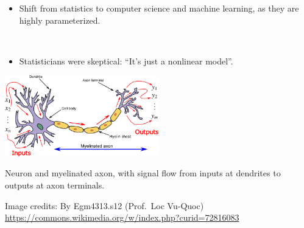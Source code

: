 \documentclass[
  10pt,
  ignorenonframetext,
]{beamer}
\providecommand{\tightlist}{%
  \setlength{\itemsep}{0pt}\setlength{\parskip}{0pt}}
\begin{document}
\begin{frame}
\begin{itemize}
\tightlist
\item
  Shift from statistics to computer science and machine learning, as
  they are highly parameterized.
\end{itemize}

\(~\)

\begin{itemize}
\tightlist
\item
  Statisticians were skeptical: ``It's just a nonlinear model''.
\end{itemize}
\end{frame}

\begin{frame}
\centering

\includegraphics[width=0.5\textwidth,height=\textheight]{Neuron3.png}

\flushleft

Neuron and myelinated axon, with signal flow from inputs at dendrites to
outputs at axon terminals.

\scriptsize

Image credits: By Egm4313.s12 (Prof.~Loc Vu-Quoc)
\url{https://commons.wikimedia.org/w/index.php?curid=72816083}
\end{frame}
\end{document}
